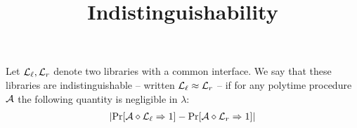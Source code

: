 \documentclass{article}
\title{Indistinguishability}
\begin{document}
\maketitle

\begin{definition}[Indistinguishability]
  Let $\mathcal{L}_\ell, \mathcal{L}_r$ denote two libraries with a common interface. We say
  that these libraries are indistinguishable -- written $\mathcal{L}_\ell \approx \mathcal{L}_r$ -- if for any polytime
  procedure $\mathcal{A}$ the following quantity is negligible in $\lambda$:
  \begin{align*}
    |\mathrm{Pr}[\mathcal{A} \diamond \mathcal{L}_\ell \Rightarrow 1]
    -
    \mathrm{Pr}[\mathcal{A} \diamond \mathcal{L}_r \Rightarrow 1]|
  \end{align*}
\end{definition}
\end{document}
